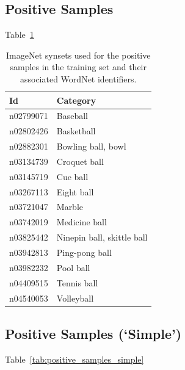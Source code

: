 \documentclass{llncs}
\begin{document}
{		\subsection{Positive Samples} {

			Table~\ref{tab:positive_samples}

			\begin{table}
				\centering
				\caption{ImageNet synsets used for the positive samples in the training set and their associated WordNet \citep{fellbaum1998wordnet} identifiers.}
				\label{tab:positive_samples}
				\begin{tabularx}{\textwidth}{lX}
					\toprule
					\textbf{Id} & \textbf{Category} \\
					\midrule
						n02799071 & Baseball \\
						n02802426 & Basketball \\
						n02882301 & Bowling ball, bowl \\
						n03134739 & Croquet ball \\
						n03145719 & Cue ball \\
						n03267113 & Eight ball \\
						n03721047 & Marble \\
						n03742019 & Medicine ball \\
						n03825442 & Ninepin ball, skittle ball \\
						n03942813 & Ping-pong ball \\
						n03982232 & Pool ball \\
						n04409515 & Tennis ball \\
						n04540053 & Volleyball \\
					\bottomrule
				\end{tabularx}
			\end{table}

		}

		\subsection{Positive Samples (`Simple')} {

			Table~\ref{tab:positive_samples_simple}

}}
\end{document}
